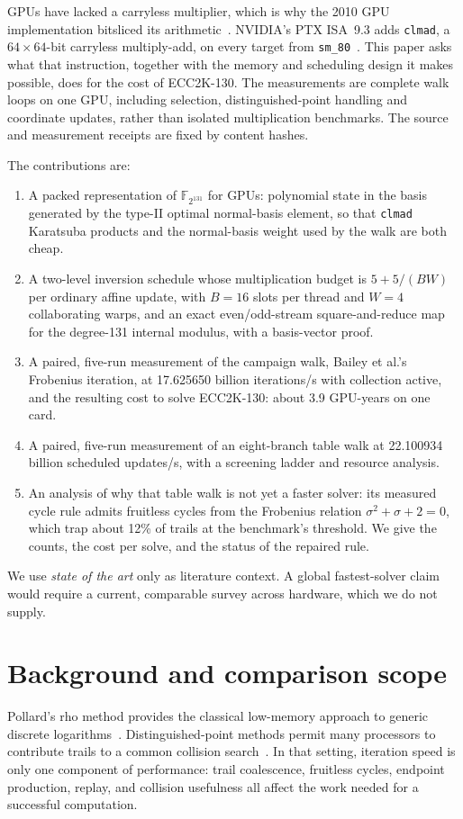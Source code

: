 \documentclass[11pt,a4paper]{article}
\newcommand{\F}{\mathbb{F}}
\newcommand{\code}[1]{\texttt{\small #1}}
\begin{document}
GPUs have lacked a carryless multiplier, which is why the 2010 GPU implementation bitsliced its arithmetic~\cite{bernstein2012}. NVIDIA's PTX ISA~9.3 adds \code{clmad}, a $64\times64$-bit carryless multiply-add, on every target from \code{sm\_80}~\cite{nvidiaPTX,nvidiaBlog}. This paper asks what that instruction, together with the memory and scheduling design it makes possible, does for the cost of ECC2K-130. The measurements are complete walk loops on one GPU, including selection, distinguished-point handling and coordinate updates, rather than isolated multiplication benchmarks. The source and measurement receipts are fixed by content hashes.

The contributions are:
\begin{enumerate}
\item A packed representation of $\F_{2^{131}}$ for GPUs: polynomial state in the basis generated by the type-II optimal normal-basis element, so that \code{clmad} Karatsuba products and the normal-basis weight used by the walk are both cheap.
\item A two-level inversion schedule whose multiplication budget is $5+5/(BW)$ per ordinary affine update, with $B=16$ slots per thread and $W=4$ collaborating warps, and an exact even/odd-stream square-and-reduce map for the degree-131 internal modulus, with a basis-vector proof.
\item A paired, five-run measurement of the campaign walk, Bailey et al.'s Frobenius iteration, at 17.625650 billion iterations/s with collection active, and the resulting cost to solve ECC2K-130: about 3.9 GPU-years on one card.
\item A paired, five-run measurement of an eight-branch table walk at 22.100934 billion scheduled updates/s, with a screening ladder and resource analysis.
\item An analysis of why that table walk is not yet a faster solver: its measured cycle rule admits fruitless cycles from the Frobenius relation $\sigma^2+\sigma+2=0$, which trap about 12\% of trails at the benchmark's threshold. We give the counts, the cost per solve, and the status of the repaired rule.
\end{enumerate}

We use \emph{state of the art} only as literature context. A global fastest-solver claim would require a current, comparable survey across hardware, which we do not supply.

\section{Background and comparison scope}
Pollard's rho method provides the classical low-memory approach to generic discrete logarithms~\cite{pollard1978}. Distinguished-point methods permit many processors to contribute trails to a common collision search~\cite{vow1999}. In that setting, iteration speed is only one component of performance: trail coalescence, fruitless cycles, endpoint production, replay, and collision usefulness all affect the work needed for a successful computation.
\end{document}
